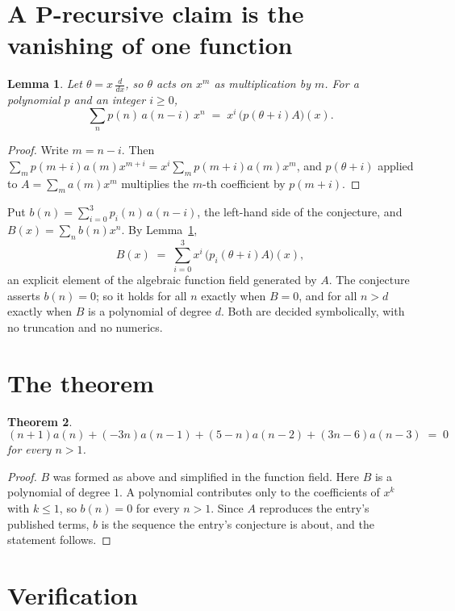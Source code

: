\documentclass[11pt,a4paper]{article}
\theoremstyle{plain}
\newtheorem{theorem}{Theorem}
\newtheorem{lemma}[theorem]{Lemma}
\theoremstyle{definition}
\begin{document}
\section{A P-recursive claim is the vanishing of one function}

\begin{lemma}\label{lem:theta}
Let $\theta=x\,\frac{d}{dx}$, so $\theta$ acts on $x^m$ as multiplication by $m$. For a
polynomial $p$ and an integer $i\ge0$,
\[
\sum_{n} p(n)\,a(n-i)\,x^{n}\;=\;x^{i}\,\bigl(p(\theta+i)A\bigr)(x).
\]
\end{lemma}

\begin{proof}
Write $m=n-i$. Then $\sum_m p(m+i)a(m)x^{m+i}=x^i\sum_m p(m+i)a(m)x^m$, and $p(\theta+i)$
applied to $A=\sum_m a(m)x^m$ multiplies the $m$-th coefficient by $p(m+i)$.
\end{proof}

Put $b(n)=\sum_{i=0}^{3}p_i(n)\,a(n-i)$, the left-hand side of the conjecture, and
$B(x)=\sum_n b(n)x^n$. By Lemma~\ref{lem:theta},
\[
B(x)\;=\;\sum_{i=0}^{3}x^{i}\,\bigl(p_i(\theta+i)A\bigr)(x),
\]
an explicit element of the algebraic function field generated by $A$. The conjecture asserts
$b(n)=0$; so it holds for all $n$ exactly when $B=0$, and for all $n>d$ exactly when $B$ is a
polynomial of degree $d$. Both are decided symbolically, with no truncation and no numerics.

\section{The theorem}

\begin{theorem}
\[
\left(n + 1\right)a(n) + \left(- 3 n\right)a(n-1) + \left(5 - n\right)a(n-2) + \left(3 n - 6\right)a(n-3)\;=\;0
\]
for every $n>1$.
\end{theorem}

\begin{proof}
$B$ was formed as above and simplified in the function field. Here $B$ is a polynomial of degree $1$. A polynomial contributes only to the coefficients of $x^k$ with $k\le1$, so $b(n)=0$ for every $n>1$. Since $A$ reproduces the
entry's published terms, $b$ is the sequence the entry's conjecture is about, and the statement
follows.
\end{proof}

\section{Verification}
\end{document}
